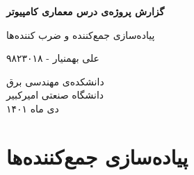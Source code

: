 \documentclass{article}
\begin{document}
\begin{titlepage}
   \begin{center}
   \Large
       \vspace*{1cm}

       \textbf{گزارش پروژه‌ی درس معماری کامپیوتر}

       \vspace{0.5cm}
      پیاده‌سازی جمع‌کننده و ضرب کننده‌ها        
      
       \vspace{1.5cm}
       {علی بهمنیار - ۹۸۲۳۰۱۸}
       \vfill
 
       \vspace{0.8cm}
     	\begin{figure}[H]%
	   	 	\centering
	    	\quad
		\end{figure}
            
       دانشکده‌ی مهندسی برق\\
       دانشگاه صنعتی امیرکبیر\\
       دی ماه ۱۴۰۱       
   \end{center}
\end{titlepage}

\pagebreak
\tableofcontents
\pagebreak

\section{پیاده‌سازی جمع‌کننده‌ها}
\end{document}
